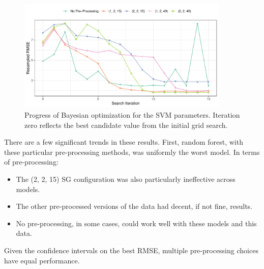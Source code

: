 \documentclass[
  letterpaper,
  DIV=11,
  numbers=noendperiod]{scrartcl}
\begin{document}
\begin{figure}[t!]

{\centering \includegraphics[width=0.9\textwidth,height=\textheight]{figures/fig-svm-search-1.pdf}

}

\caption{\label{fig-svm-search}Progress of Bayesian optimization for the
SVM parameters. Iteration zero reflects the best candidate value from
the initial grid search.}

\end{figure}

There are a few significant trends in these results. First, random
forest, with these particular pre-processing methods, was uniformly the
worst model. In terms of pre-processing:

\begin{itemize}
\item
  The (2, 2, 15) SG configuration was also particularly ineffective
  across models.
\item
  The other pre-processed versions of the data had decent, if not fine,
  results.
\item
  No pre-processing, in some cases, could work well with these models
  and this data.
\end{itemize}

Given the confidence intervals on the best RMSE, multiple pre-processing
choices have equal performance.
\end{document}
